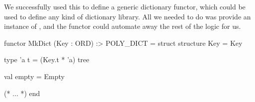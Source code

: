\documentclass[aspectratio=169, handout]{beamer}
\begin{document}
{\begin{frame}[fragile]
  We successfully used this to define a generic dictionary functor, which could be used
  to define any kind of dictionary library. All we needed to do was provide an instance
  of , and the functor could automate away the rest of the logic for us.

  \pause
  \begin{codeblock}
    functor MkDict (Key : ORD) :> POLY_DICT =
    struct
      structure Key = Key

      type 'a t = (Key.t * 'a) tree

      val empty = Empty

      (* ... *)
    end
  \end{codeblock}

  \pause
\end{frame}
}
\end{document}
